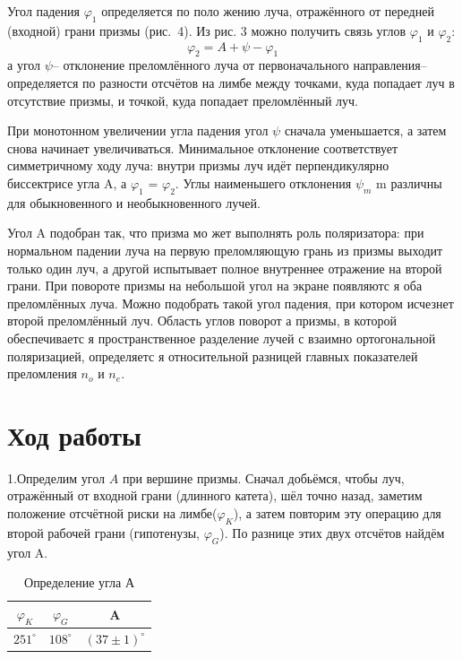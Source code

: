 \documentclass[journal, a4paper]{IEEEtran}
\begin{document}
Угол падения
$\varphi_1$ определяется по поло
жению луча, отражённого от
передней (входной) грани призмы (рис.~4). Из рис. 3 можно получить
связь углов
$\varphi_1$ и
$\varphi_2$:
\begin{equation}
\varphi_2=A+\psi-\varphi_1
\end{equation}
а угол $\psi$-- отклонение преломлённого луча от первоначального направления-- определяется по разности отсчётов на лимбе между точками,
куда попадает луч в отсутствие призмы,
и точкой, куда попадает преломлённый луч.

При монотонном увеличении угла падения угол
$\psi$ сначала уменьшается,
а затем снова начинает увеличиваться. Минимальное отклонение
соответствует симметричному
ходу луча: внутри призмы луч идёт перпендикулярно биссектрисе угла
A, а
$\varphi_1$ =
$\varphi_2$. Углы наименьшего отклонения
$\psi_m$
m различны для обыкновенного
и необыкновенного лучей.

Угол
A подобран так, что призма мо
жет выполнять роль поляризатора: при нормальном падении луча на первую преломляющую грань
из призмы выходит только один луч,
а другой испытывает полное внутреннее отражение на второй грани. При повороте призмы на небольшой угол на экране появляютс
я оба преломлённых луча. Можно подобрать такой угол падения, при
котором исчезнет второй преломлённый
луч. Область углов поворот
а призмы, в которой обеспечиваетс
я пространственное разделение лучей с взаимно ортогональной поляризацией, определяетс
я относительной разницей главных показателей преломления
$n_o$ и
$n_e$.
\section{Ход работы}
{\normalsize 1.}{\normalsize Определим угол $A$ при вершине призмы.}
Сначал добьёмся, чтобы луч, отражённый от входной грани (длинного
катета), шёл
точно назад,  заметим положение отсчётной риски на лимбе($\varphi_K$),
а затем повторим эту операцию для второй рабочей грани (гипотенузы, $\varphi_G$). По разнице этих двух отсчётов найдём угол A.
\begin{table}[h!]
\begin{center}
\begin{tabular}{|c|c|c|}
\hline 
$\varphi_K$ & $\varphi_G$ & A \\ 
\hline 
$251^{\circ}$ & $108^{\circ}$& $(37\pm1)^{\circ}$\\ 
\hline 
\end{tabular}
\end{center}
\caption{Определение угла А} 
\end{table}
\end{document}
